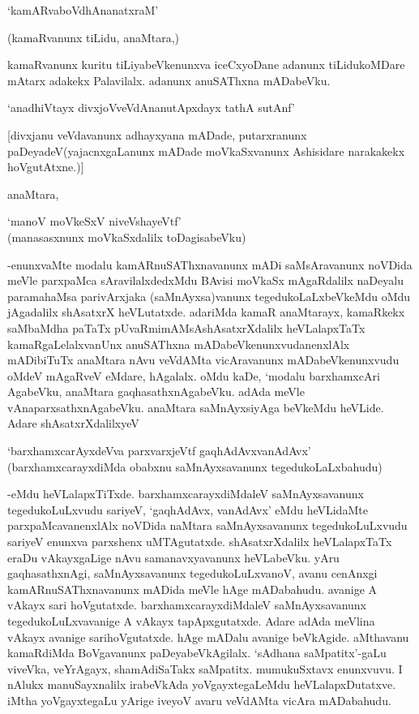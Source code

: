 \begin{shloka}
`kamARvaboVdhAnanatxraM'
\end{shloka}

(kamaRvanunx tiLidu, anaMtara,)

kamaRvanunx kuritu tiLiyabeVkenunxva iceCxyoDane adanunx tiLidukoMDare mAtarx adakekx Palavilalx. adanunx anuSAThxna mADabeVku.

\begin{shloka}
`anadhiVtayx divxjoVveVdAnanutApxdayx tathA sutAnf'
\end{shloka}

[divxjanu veVdavanunx adhayxyana mADade, putarxranunx paDeyadeV(yajacnxgaLanunx mADade moVkaSxvanunx Ashisidare narakakekx hoVgutAtxne.)]

anaMtara,

\begin{shloka}
`manoV moVkeSxV niveVshayeVtf'\\
(manasasxnunx moVkaSxdalilx toDagisabeVku)
\end{shloka}

-enunxvaMte modalu kamARnuSAThxnavanunx mADi saMsAravanunx noVDida meVle parxpaMca sAravilalxdedxMdu BAvisi moVkaSx mAgaRdalilx naDeyalu paramahaMsa parivArxjaka (saMnAyxsa)vanunx tegedukoLaLxbeVkeMdu oMdu jAgadalilx shAsatxrX heVLutatxde. adariMda kamaR anaMtarayx, kamaRkekx saMbaMdha paTaTx pUvaRmimAMsAshAsatxrXdalilx heVLalapxTaTx kamaRgaLelalxvanUnx anuSAThxna mADabeVkenunxvudanenxlAlx mADibiTuTx anaMtara nAvu veVdAMta vicAravanunx mADabeVkenunxvudu oMdeV mAgaRveV eMdare, hAgalalx. oMdu kaDe, `modalu barxhamxcAri AgabeVku, anaMtara gaqhasathxnAgabeVku. adAda meVle vAnaparxsathxnAgabeVku. anaMtara saMnAyxsiyAga beVkeMdu heVLide. Adare shAsatxrXdalilxyeV

\begin{shloka}
`barxhamxcarAyxdeVva parxvarxjeVtf gaqhAdAvxvanAdAvx'\\
(barxhamxcarayxdiMda obabxnu saMnAyxsavanunx tegedukoLaLxbahudu)
\end{shloka} 

-eMdu heVLalapxTiTxde. barxhamxcarayxdiMdaleV saMnAyxsavanunx tegedukoLuLxvudu sariyeV, `gaqhAdAvx, vanAdAvx' eMdu heVLidaMte parxpaMcavanenxlAlx noVDida naMtara saMnAyxsavanunx tegedukoLuLxvudu sariyeV enunxva parxshenx uMTAgutatxde. shAsatxrXdalilx heVLalapxTaTx eraDu vAkayxgaLige nAvu samanavxyavanunx heVLabeVku. yAru gaqhasathxnAgi, saMnAyxsavanunx tegedukoLuLxvanoV, avanu cenAnxgi kamARnuSAThxnavanunx mADida meVle hAge mADabahudu. avanige A vAkayx sari hoVgutatxde. barxhamxcarayxdiMdaleV saMnAyxsavanunx tegedukoLuLxvavanige A vAkayx tapApxgutatxde. Adare adAda meVlina vAkayx avanige sarihoVgutatxde. hAge mADalu avanige beVkAgide. aMthavanu kamaRdiMda BoVgavanunx paDeyabeVkAgilalx. `sAdhana saMpatitx'-gaLu viveVka, veYrAgayx, shamAdiSaTakx saMpatitx. mumukuSxtavx enunxvuvu. I nAlukx manuSayxnalilx irabeVkAda yoVgayxtegaLeMdu heVLalapxDutatxve. iMtha yoVgayxtegaLu yArige iveyoV avaru veVdAMta vicAra mADabahudu.

